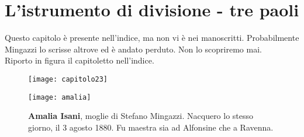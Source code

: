

\chapter{L'istrumento di divisione - tre paoli}

Questo capitolo è presente nell'indice, ma non vi è nei manoscritti. Probabilmente Mingazzi lo scrisse altrove ed è andato perduto. Non lo scopriremo mai.\\

Riporto in figura il capitoletto nell'indice.
 \begin{figure}[htb]
    \centering
    \texttt{[image: capitolo23]}
\end{figure}

 \begin{figure}[htb]
    \centering
    \vspace{-0.3cm}
    \texttt{[image: amalia]}
    \caption[Amalia Isani]{\textbf{Amalia Isani}, moglie di Stefano Mingazzi. Nacquero lo stesso giorno, il 3 agosto 1880. Fu maestra sia ad Alfonsine che a Ravenna.\label{fig:amalia}}
    \vspace{-0.7cm}
\end{figure}
